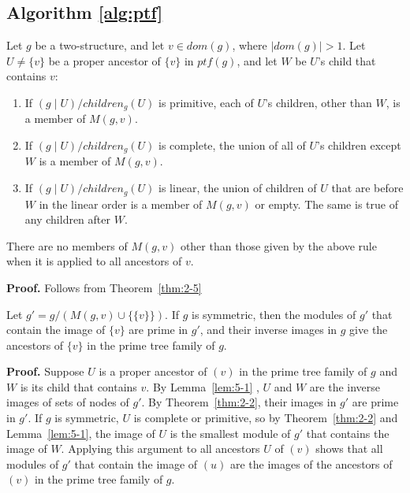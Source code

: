 \subsection{Algorithm \ref{alg:ptf}}\label{subsec:algorithm-ptf(g)}

\begin{mylem}
    \label{lem:5-1}
    Let $g$ be a two-structure, and let $v \in dom(g)$, where $\mid dom(g) \mid > 1$.
    Let $U \neq \{v\}$ be a proper ancestor of $\{v\}$ in $ptf(g)$, and let $W$ be $U$'s child that contains $v$:
    \begin{enumerate}
        \item If $(g \mid U) / children_g(U)$ is primitive, each of $U$'s children, other than $W$, is a member of $M(g, v)$.
        \item If $(g \mid U) / children_g(U)$ is complete, the union of all of $U$'s children except $W$ is a member of $M(g, v)$.
        \item If $(g \mid U) / children_g(U)$ is linear, the union of children of $U$ that are before $W$ in the linear order is a member of $M(g, v)$ or empty.
        The same is true of any children after $W$.
    \end{enumerate}

    There are no members of $M(g, v)$ other than those given by the above rule when it is applied to all ancestors of $v$.
\end{mylem}

\textbf{Proof.}
Follows from Theorem~\ref{thm:2-5}

\begin{mytheo}
    \label{thm:5-2}
    Let $g' = g / (M(g, v) \cup \{\{v\}\})$.
    If $g$ is symmetric, then the modules of $g'$ that contain the image of $\{v\}$ are prime in $g'$, and their inverse images in $g$ give the ancestors of $\{v\}$ in the prime tree family of $g$.
\end{mytheo}

\textbf{Proof.}
Suppose $U$ is a proper ancestor of $(v)$ in the prime tree family of $g$ and $W$ is its child that contains $v$.
By Lemma~\ref{lem:5-1} , $U$ and $W$ are the inverse images of sets of nodes of $g'$.
By Theorem~\ref{thm:2-2}, their images in $g'$ are prime in $g'$.
If $g$ is symmetric, $U$ is complete or primitive, so by Theorem~\ref{thm:2-2} and Lemma~\ref{lem:5-1}, the image of $U$ is the smallest module of $g'$ that contains the image of $W$.
Applying this argument to all ancestors $U$ of $(v)$ shows that all modules of $g'$ that contain the image of $(u)$ are the images
of the ancestors of $(v)$ in the prime tree family of $g$.

